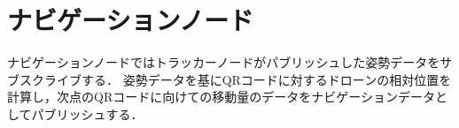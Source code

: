\section{ナビゲーションノード}
\label{proposed_navigation}
ナビゲーションノードではトラッカーノードがパブリッシュした姿勢データをサブスクライブする．
姿勢データを基にQRコードに対するドローンの相対位置を計算し，次点のQRコードに向けての移動量のデータをナビゲーションデータとしてパブリッシュする．

